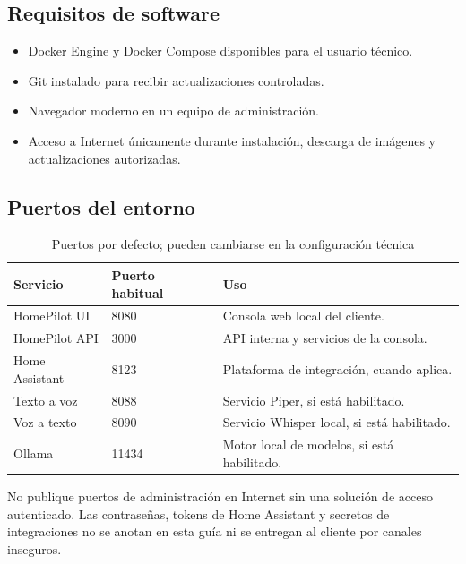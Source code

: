 \subsection{Requisitos de software}
\begin{itemize}[itemsep=0.15cm]
    \item Docker Engine y Docker Compose disponibles para el usuario técnico.
    \item Git instalado para recibir actualizaciones controladas.
    \item Navegador moderno en un equipo de administración.
    \item Acceso a Internet únicamente durante instalación, descarga de imágenes y actualizaciones autorizadas.
\end{itemize}

\subsection{Puertos del entorno}
\begin{table}[h]
\centering
\begin{tabularx}{\textwidth}{|l|l|X|}
\hline
\textbf{Servicio} & \textbf{Puerto habitual} & \textbf{Uso} \\
\hline
HomePilot UI & 8080 & Consola web local del cliente. \\
HomePilot API & 3000 & API interna y servicios de la consola. \\
Home Assistant & 8123 & Plataforma de integración, cuando aplica. \\
Texto a voz & 8088 & Servicio Piper, si está habilitado. \\
Voz a texto & 8090 & Servicio Whisper local, si está habilitado. \\
Ollama & 11434 & Motor local de modelos, si está habilitado. \\
\hline
\end{tabularx}
\caption{Puertos por defecto; pueden cambiarse en la configuración técnica}
\end{table}

\begin{tcolorbox}[title=Seguridad antes de instalar]
No publique puertos de administración en Internet sin una solución de acceso autenticado. Las contraseñas, tokens de Home Assistant y secretos de integraciones no se anotan en esta guía ni se entregan al cliente por canales inseguros.
\end{tcolorbox}
